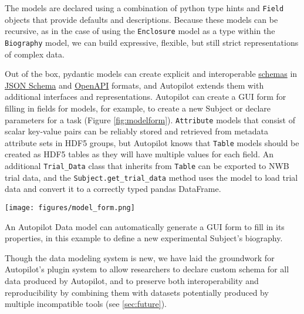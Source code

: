 The models are declared using a combination of python type hints and \texttt{Field} objects that provide defaults and descriptions. Because these models can be recursive, as in the case of using the \texttt{Enclosure} model as a type within the \texttt{Biography} model, we can build expressive, flexible, but still strict representations of complex data. 

Out of the box, pydantic models can create explicit and interoperable \href{https://pydantic-docs.helpmanual.io/usage/schema/}{schemas} in \href{https://json-schema.org/draft/2020-12/json-schema-core.html}{JSON Schema} and \href{https://github.com/OAI/OpenAPI-Specification}{OpenAPI} formats, and Autopilot extends them with additional interfaces and representations. Autopilot can create a GUI form for filling in fields for models, for example, to create a new Subject or declare parameters for a task (Figure \ref{fig:modelform}). \texttt{Attribute} models that consist of scalar key-value pairs can be reliably stored and retrieved from metadata attribute sets in HDF5 groups, but Autopilot knows that \texttt{Table} models should be created as HDF5 tables as they will have multiple values for each field. An additional \texttt{Trial\_Data} class that inherits from \texttt{Table} can be exported to NWB trial data, and the \texttt{Subject.get\_trial\_data} method uses the model to load trial data and convert it to a correctly typed pandas\citep{mckinneyPandasFoundationalPython2011} DataFrame.

\begin{marginfigure}
\texttt{[image: figures/model\_form.png]}
\label{fig:modelform}
\caption{An Autopilot Data model can automatically generate a GUI form to fill in its properties, in this example to define a new experimental Subject's biography.}
\end{marginfigure}

Though the data modeling system is new, we have laid the groundwork for Autopilot's plugin system to allow researchers to declare custom schema for all data produced by Autopilot, and to preserve both interoperability and reproducibility by combining them with datasets potentially produced by multiple incompatible tools (see \ref{sec:future}).



